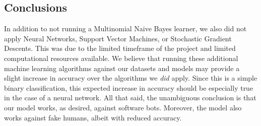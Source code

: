 \documentclass{article}[12pt]
\numberwithin{equation}{subsection}
\begin{document}
\begin{flushleft}
\section{Conclusions}

In addition to not running a Multinomial Naive Bayes learner, we also did not apply Neural Networks, Support Vector Machines, or Stochastic Gradient Descents.  This was due to the limited timeframe of the project and limited computational resources available.  We believe that running these additional machine learning algorithms against our datasets and models may provide a slight increase in accuracy over the algorithms we \emph{did} apply.  Since this is a simple binary classification, this expected increase in accuracy should be especially true in the case of a neural network.  All that said, the unambiguous conclusion is that our model works, as desired, against software bots.  Moreover, the model also works against fake humans, albeit with reduced accuracy. \newline


\end{flushleft}
\end{document}
